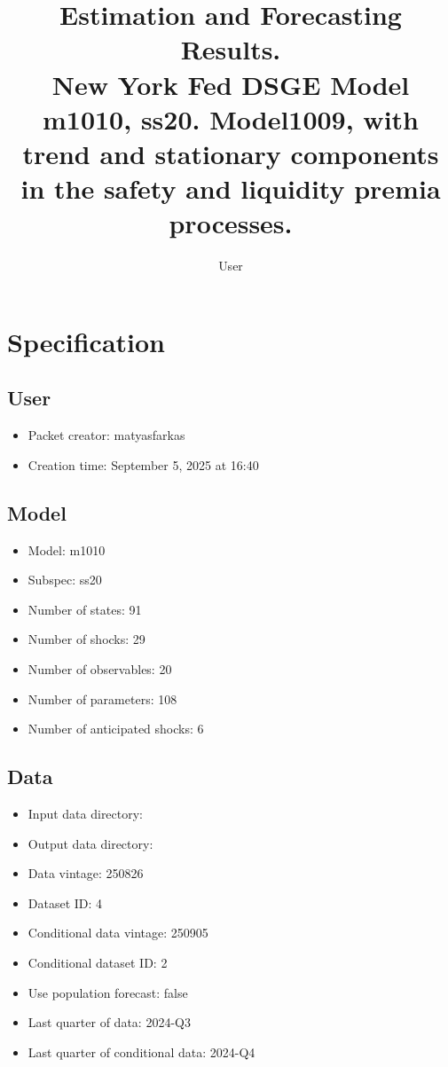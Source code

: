 \documentclass{article}
\title{Estimation and Forecasting Results. \\ New York Fed DSGE Model m1010, ss20. Model1009, with trend and stationary components in the safety and liquidity premia processes.}
\author{User}
\begin{document}
\maketitle


\section{Specification}

\subsection{User}

\begin{itemize}
  \item Packet creator: matyasfarkas
  \item Creation time: September 5, 2025 at 16:40
\end{itemize}

\subsection{Model}

\begin{itemize}
  \item Model: m1010
  \item Subspec: ss20
  \item Number of states: 91
  \item Number of shocks: 29
  \item Number of observables: 20
  \item Number of parameters: 108
  \item Number of anticipated shocks: 6
\end{itemize}

\subsection{Data}

\begin{itemize}
  \item Input data directory: 
  \item Output data directory: 
  \item Data vintage: 250826
  \item Dataset ID: 4
  \item Conditional data vintage: 250905
  \item Conditional dataset ID: 2
  \item Use population forecast: false
  \item Last quarter of data: 2024-Q3
  \item Last quarter of conditional data: 2024-Q4
\end{itemize}
\end{document}
